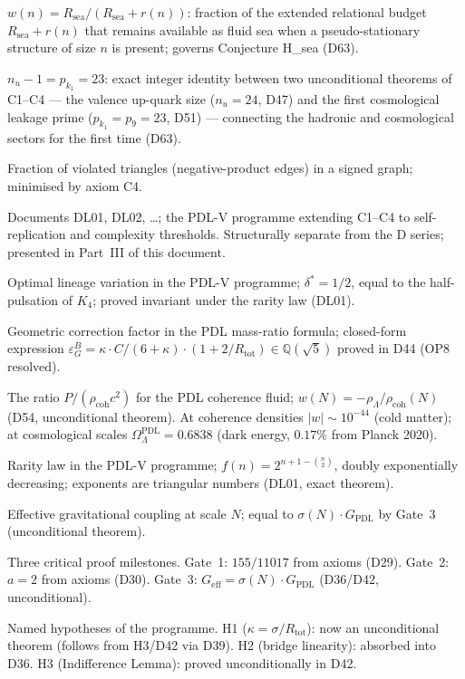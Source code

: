 \documentclass[11pt,a4paper]{article}
\theoremstyle{plain}
\theoremstyle{definition}
\theoremstyle{remark}
\newcommand{\Geff}{G_{\mathrm{eff}}}
\newcommand{\GPDL}{G_{\mathrm{PDL}}}
\newcommand{\Rtot}{R_{\mathrm{tot}}}
\newcommand{\sigmaN}{\sigma(N)}
\newcommand{\epsGeomB}{\varepsilon_G^B}
\newcommand{\rhocoh}{\rho_{\mathrm{coh}}}
\begin{document}
\begin{description}[leftmargin=3.5cm, style=nextline]
\item[Residual fluidity] $w(n) = R_{\mathrm{sea}}/(R_{\mathrm{sea}}+r(n))$: fraction of the extended relational budget $R_{\mathrm{sea}}+r(n)$ that remains available as fluid sea when a pseudo-stationary structure of size $n$ is present; governs Conjecture H\_sea (D63).
\item[Structural identity] $n_u - 1 = p_{k_1} = 23$: exact integer identity between two unconditional theorems of C1--C4 --- the valence up-quark size ($n_u = 24$, D47) and the first cosmological leakage prime ($p_{k_1} = p_9 = 23$, D51) --- connecting the hadronic and cosmological sectors for the first time (D63).
\item[Coherence cost] Fraction of violated triangles (negative-product edges) in a signed graph; minimised by axiom C4.
\item[DL series] Documents DL01, DL02, \ldots; the PDL-V programme extending C1--C4 to self-replication and complexity thresholds. Structurally separate from the D series; presented in Part~III of this document.
\item[$\delta^*$] Optimal lineage variation in the PDL-V programme; $\delta^* = 1/2$, equal to the half-pulsation of $K_4$; proved invariant under the rarity law (DL01).
\item[$\epsGeomB$] Geometric correction factor in the PDL mass-ratio formula; closed-form expression $\epsGeomB = \kappa \cdot C/(6+\kappa)\cdot(1+2/\Rtot) \in \mathbb{Q}(\sqrt{5})$ proved in D44 (OP8 resolved).
\item[Equation of state $w(N)$] The ratio $P/(\rhocoh c^2)$ for the PDL coherence fluid; $w(N) = -\rho_\Lambda/\rhocoh(N)$ (D54, unconditional theorem). At coherence densities $|w| \sim 10^{-44}$ (cold matter); at cosmological scales $\Omega_\Lambda^{\mathrm{PDL}} = 0.6838$ (dark energy, $0.17\%$ from Planck 2020).
\item[$f(n)$] Rarity law in the PDL-V programme; $f(n) = 2^{n+1-\binom{n}{2}}$, doubly exponentially decreasing; exponents are triangular numbers (DL01, exact theorem).
\item[$\Geff(N)$] Effective gravitational coupling at scale $N$; equal to $\sigmaN\cdot\GPDL$ by Gate~3 (unconditional theorem).
\item[Gate 1, 2, 3] Three critical proof milestones. Gate~1: $155/11017$ from axioms (D29). Gate~2: $a=2$ from axioms (D30). Gate~3: $\Geff=\sigmaN\cdot\GPDL$ (D36/D42, unconditional).
\item[H1, H2, H3] Named hypotheses of the programme. H1 ($\kappa=\sigma/R_{\mathrm{tot}}$): now an unconditional theorem (follows from H3/D42 via D39). H2 (bridge linearity): absorbed into D36. H3 (Indifference Lemma): proved unconditionally in D42.

\end{description}
\end{document}

